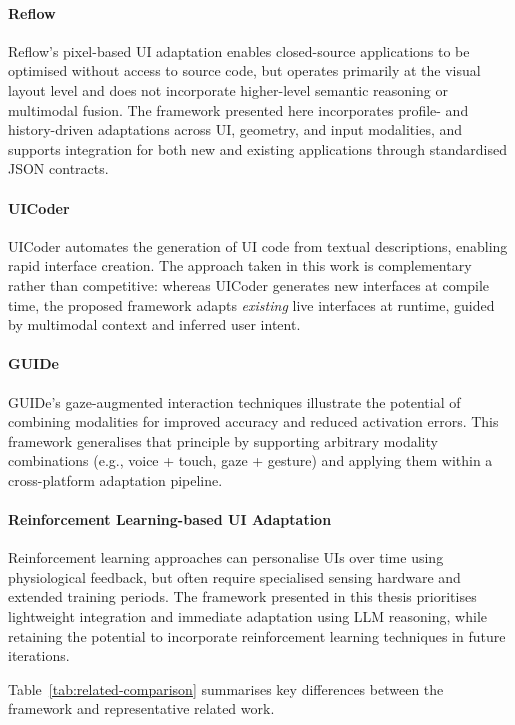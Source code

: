 \paragraph{Reflow \cite{Wu2024}}
Reflow’s pixel-based UI adaptation enables closed-source applications to be optimised without access to source code, but operates primarily at the visual layout level and does not incorporate higher-level semantic reasoning or multimodal fusion. The framework presented here incorporates profile- and history-driven adaptations across UI, geometry, and input modalities, and supports integration for both new and existing applications through standardised JSON contracts.

\paragraph{UICoder \cite{Wu2024}}
UICoder automates the generation of UI code from textual descriptions, enabling rapid interface creation. The approach taken in this work is complementary rather than competitive: whereas UICoder generates new interfaces at compile time, the proposed framework adapts \emph{existing} live interfaces at runtime, guided by multimodal context and inferred user intent.

\paragraph{GUIDe \cite{kumar2007guide}}
GUIDe’s gaze-augmented interaction techniques illustrate the potential of combining modalities for improved accuracy and reduced activation errors. This framework generalises that principle by supporting arbitrary modality combinations (e.g., voice + touch, gaze + gesture) and applying them within a cross-platform adaptation pipeline.

\paragraph{Reinforcement Learning-based UI Adaptation \cite{gaspar2023learning}}
Reinforcement learning approaches can personalise UIs over time using physiological feedback, but often require specialised sensing hardware and extended training periods. The framework presented in this thesis prioritises lightweight integration and immediate adaptation using LLM reasoning, while retaining the potential to incorporate reinforcement learning techniques in future iterations.

\medskip
Table~\ref{tab:related-comparison} summarises key differences between the framework and representative related work.

